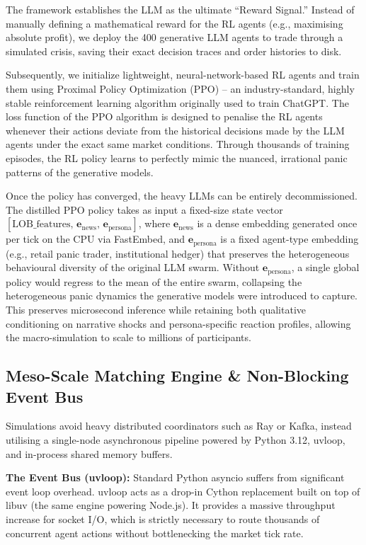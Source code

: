 \documentclass[10pt,a4paper]{article}
\begin{document}
The framework establishes the LLM as the ultimate ``Reward Signal.'' Instead of manually defining a mathematical reward for the RL agents (e.g., maximising absolute profit), we deploy the 400 generative LLM agents to trade through a simulated crisis, saving their exact decision traces and order histories to disk. 

Subsequently, we initialize lightweight, neural-network-based RL agents and train them using Proximal Policy Optimization (PPO) -- an industry-standard, highly stable reinforcement learning algorithm originally used to train ChatGPT. The loss function of the PPO algorithm is designed to penalise the RL agents whenever their actions deviate from the historical decisions made by the LLM agents under the exact same market conditions. Through thousands of training episodes, the RL policy learns to perfectly mimic the nuanced, irrational panic patterns of the generative models. 

Once the policy has converged, the heavy LLMs can be entirely decommissioned. The distilled PPO policy takes as input a fixed-size state vector $[\text{LOB\_features},\, \mathbf{e}_{\text{news}},\, \mathbf{e}_{\text{persona}}]$, where $\mathbf{e}_{\text{news}}$ is a dense embedding generated once per tick on the CPU via FastEmbed, and $\mathbf{e}_{\text{persona}}$ is a fixed agent-type embedding (e.g., retail panic trader, institutional hedger) that preserves the heterogeneous behavioural diversity of the original LLM swarm. Without $\mathbf{e}_{\text{persona}}$, a single global policy would regress to the mean of the entire swarm, collapsing the heterogeneous panic dynamics the generative models were introduced to capture. This preserves microsecond inference while retaining both qualitative conditioning on narrative shocks and persona-specific reaction profiles, allowing the macro-simulation to scale to millions of participants.

\subsection{Meso-Scale Matching Engine \& Non-Blocking Event Bus}

Simulations avoid heavy distributed coordinators such as Ray or Kafka, instead utilising a single-node asynchronous pipeline powered by Python 3.12, uvloop, and in-process shared memory buffers.

\textbf{The Event Bus (uvloop):} Standard Python asyncio suffers from significant event loop overhead. uvloop acts as a drop-in Cython replacement built on top of libuv (the same engine powering Node.js). It provides a massive throughput increase for socket I/O, which is strictly necessary to route thousands of concurrent agent actions without bottlenecking the market tick rate.
\end{document}
